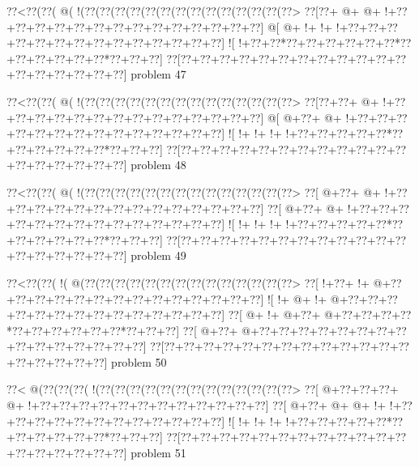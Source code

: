 \vbox{\vbox{\goo
\0??<\0??(\0??(\- @(\- !(\0??(\0??(\0??(\0??(\0??(\0??(\0??(\0??(\0??(\0??(\0??(\0??(\0??(\0??>
\0??[\0??+\- @+\- @+\- !+\0??+\0??+\0??+\0??+\0??+\0??+\0??+\0??+\0??+\0??+\0??+\0??+\0??+\0??]
\- @[\- @+\- !+\- !+\- !+\0??+\0??+\0??+\0??+\0??+\0??+\0??+\0??+\0??+\0??+\0??+\0??+\0??+\0??]
\- ![\- !+\0??+\0??*\0??+\0??+\0??+\0??+\0??+\0??*\0??+\0??+\0??+\0??+\0??+\0??*\0??+\0??+\0??]
\0??[\0??+\0??+\0??+\0??+\0??+\0??+\0??+\0??+\0??+\0??+\0??+\0??+\0??+\0??+\0??+\0??+\0??+\0??]
}
\hfil problem 47\hfil\break
}



\vbox{\vbox{\goo
\0??<\0??(\0??(\- @(\- !(\0??(\0??(\0??(\0??(\0??(\0??(\0??(\0??(\0??(\0??(\0??(\0??(\0??(\0??>
\0??[\0??+\0??+\- @+\- !+\0??+\0??+\0??+\0??+\0??+\0??+\0??+\0??+\0??+\0??+\0??+\0??+\0??+\0??]
\- @[\- @+\0??+\- @+\- !+\0??+\0??+\0??+\0??+\0??+\0??+\0??+\0??+\0??+\0??+\0??+\0??+\0??+\0??]
\- ![\- !+\- !+\- !+\- !+\0??+\0??+\0??+\0??+\0??*\0??+\0??+\0??+\0??+\0??+\0??*\0??+\0??+\0??]
\0??[\0??+\0??+\0??+\0??+\0??+\0??+\0??+\0??+\0??+\0??+\0??+\0??+\0??+\0??+\0??+\0??+\0??+\0??]
}
\hfil problem 48\hfil\break
}



\vbox{\vbox{\goo
\0??<\0??(\0??(\- @(\- !(\0??(\0??(\0??(\0??(\0??(\0??(\0??(\0??(\0??(\0??(\0??(\0??(\0??(\0??>
\0??[\- @+\0??+\- @+\- !+\0??+\0??+\0??+\0??+\0??+\0??+\0??+\0??+\0??+\0??+\0??+\0??+\0??+\0??]
\0??[\- @+\0??+\- @+\- !+\0??+\0??+\0??+\0??+\0??+\0??+\0??+\0??+\0??+\0??+\0??+\0??+\0??+\0??]
\- ![\- !+\- !+\- !+\- !+\0??+\0??+\0??+\0??+\0??*\0??+\0??+\0??+\0??+\0??+\0??*\0??+\0??+\0??]
\0??[\0??+\0??+\0??+\0??+\0??+\0??+\0??+\0??+\0??+\0??+\0??+\0??+\0??+\0??+\0??+\0??+\0??+\0??]
}
\hfil problem 49\hfil\break
}



\vbox{\vbox{\goo
\0??<\0??(\0??(\- !(\- @(\0??(\0??(\0??(\0??(\0??(\0??(\0??(\0??(\0??(\0??(\0??(\0??(\0??(\0??>
\0??[\- !+\0??+\- !+\- @+\0??+\0??+\0??+\0??+\0??+\0??+\0??+\0??+\0??+\0??+\0??+\0??+\0??+\0??]
\- ![\- !+\- @+\- !+\- @+\0??+\0??+\0??+\0??+\0??+\0??+\0??+\0??+\0??+\0??+\0??+\0??+\0??+\0??]
\0??[\- @+\- !+\- @+\0??+\- @+\0??+\0??+\0??+\0??*\0??+\0??+\0??+\0??+\0??+\0??*\0??+\0??+\0??]
\0??[\- @+\0??+\- @+\0??+\0??+\0??+\0??+\0??+\0??+\0??+\0??+\0??+\0??+\0??+\0??+\0??+\0??+\0??]
\0??[\0??+\0??+\0??+\0??+\0??+\0??+\0??+\0??+\0??+\0??+\0??+\0??+\0??+\0??+\0??+\0??+\0??+\0??]
}
\hfil problem 50\hfil\break
}



\vbox{\vbox{\goo
\0??<\- @(\0??(\0??(\0??(\- !(\0??(\0??(\0??(\0??(\0??(\0??(\0??(\0??(\0??(\0??(\0??(\0??(\0??>
\0??[\- @+\0??+\0??+\0??+\- @+\- !+\0??+\0??+\0??+\0??+\0??+\0??+\0??+\0??+\0??+\0??+\0??+\0??]
\0??[\- @+\0??+\- @+\- @+\- !+\- !+\0??+\0??+\0??+\0??+\0??+\0??+\0??+\0??+\0??+\0??+\0??+\0??]
\- ![\- !+\- !+\- !+\- !+\0??+\0??+\0??+\0??+\0??*\0??+\0??+\0??+\0??+\0??+\0??*\0??+\0??+\0??]
\0??[\0??+\0??+\0??+\0??+\0??+\0??+\0??+\0??+\0??+\0??+\0??+\0??+\0??+\0??+\0??+\0??+\0??+\0??]
}
\hfil problem 51\hfil\break
}



